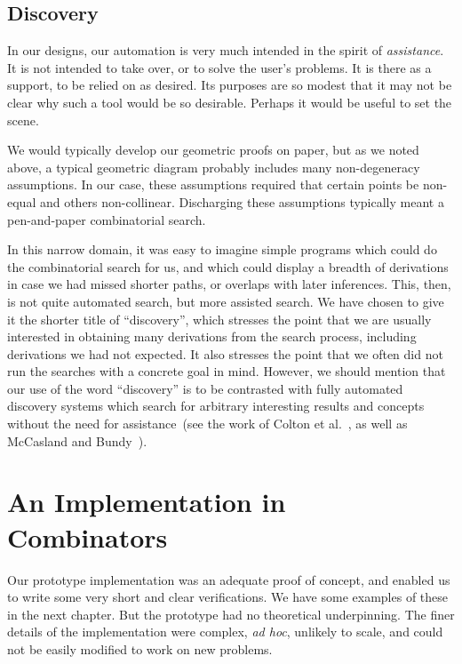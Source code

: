 
\subsection{Discovery}
In our designs, our automation is very much intended in the spirit of \emph{assistance}. It is not intended to take over, or to solve the user's problems. It is there as a support, to be relied on as desired. Its purposes are so modest that it may not be clear why such a tool would be so desirable. Perhaps it would be useful to set the scene.

We would typically develop our geometric proofs on paper, but as we noted above, a typical geometric diagram probably includes many non-degeneracy assumptions. In our case, these assumptions required that certain points be non-equal and others non-collinear. Discharging these assumptions typically meant a pen-and-paper combinatorial search.

In this narrow domain, it was easy to imagine simple programs which could do the combinatorial search for us, and which could display a breadth of derivations in case we had missed shorter paths, or overlaps with later inferences. This, then, is not quite automated search, but more assisted search. We have chosen to give it the shorter title of ``discovery'', which stresses the point that we are usually interested in obtaining many derivations from the search process, including derivations we had not expected. It also stresses the point that we often did not run the searches with a concrete goal in mind. However, we should mention that our use of the word ``discovery'' is to be contrasted with fully automated discovery systems which search for arbitrary interesting results and concepts without the need for assistance~(see the work of Colton et al.~\cite{ColtonInterestingness,MathematicalDiscovery}, as well as McCasland and Bundy~\cite{Mathsaid}).

\section{An Implementation in Combinators}\label{sec:DiscoveryAlgebra}
Our prototype implementation was an adequate proof of concept, and enabled us to write some very short and clear verifications. We have some examples of these in the next chapter. But the prototype had no theoretical underpinning. The finer details of the implementation were complex, \emph{ad hoc}, unlikely to scale, and could not be easily modified to work on new problems. 

